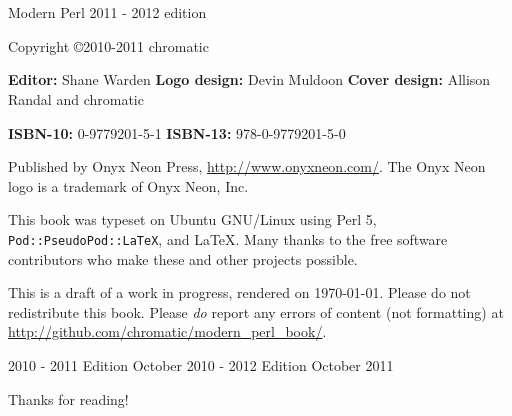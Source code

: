 \chapter*{}
\thispagestyle{empty}

\huge{Modern Perl}
\newline
\large{2011 - 2012 edition}
\newline
\newline
\normalsize

Copyright \copyright\mbox{}2010-2011 chromatic

\vfill
\textbf{Editor:} Shane Warden\newline
\textbf{Logo design:} Devin Muldoon\newline
\textbf{Cover design:} Allison Randal and chromatic

\textbf{ISBN-10:} 0-9779201-5-1\newline
\textbf{ISBN-13:} 978-0-9779201-5-0

Published by Onyx Neon Press, \url{http://www.onyxneon.com/}.
The Onyx Neon logo is a trademark of Onyx Neon, Inc.

This book was typeset on Ubuntu GNU/Linux using Perl 5,
\textnhtt{Pod::PseudoPod::LaTeX}, and \LaTeX. Many thanks to the free software
contributors who make these and other projects possible.

This is a draft of a work in progress, rendered on \today. Please do not
redistribute this book. Please \emph{do} report any errors of content (not
formatting) at \url{http://github.com/chromatic/modern_perl_book/}.

2010 - 2011 Edition October 2010 - 2012 Edition October 2011

Thanks for reading!
